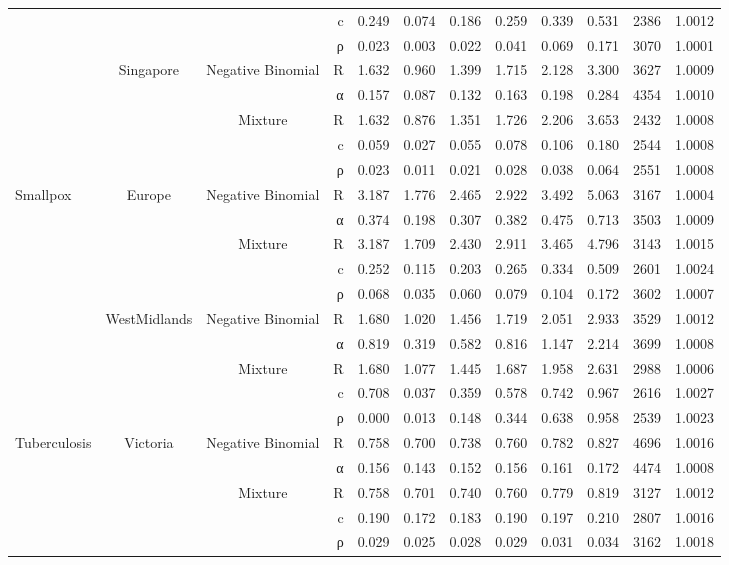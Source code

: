 \begin{table}[ht]
\begin{tabular}{lccrrrrrrrrr}
   &  &  & c & 0.249 & 0.074 & 0.186 & 0.259 & 0.339 & 0.531 & 2386 & 1.0012 \\ 
   &  &  & ρ & 0.023 & 0.003 & 0.022 & 0.041 & 0.069 & 0.171 & 3070 & 1.0001 \\ 
   & Singapore & Negative Binomial & R & 1.632 & 0.960 & 1.399 & 1.715 & 2.128 & 3.300 & 3627 & 1.0009 \\ 
   &  &  & α & 0.157 & 0.087 & 0.132 & 0.163 & 0.198 & 0.284 & 4354 & 1.0010 \\ 
   &  & Mixture & R & 1.632 & 0.876 & 1.351 & 1.726 & 2.206 & 3.653 & 2432 & 1.0008 \\ 
   &  &  & c & 0.059 & 0.027 & 0.055 & 0.078 & 0.106 & 0.180 & 2544 & 1.0008 \\ 
   &  &  & ρ & 0.023 & 0.011 & 0.021 & 0.028 & 0.038 & 0.064 & 2551 & 1.0008 \\ 
  Smallpox & Europe & Negative Binomial & R & 3.187 & 1.776 & 2.465 & 2.922 & 3.492 & 5.063 & 3167 & 1.0004 \\ 
   &  &  & α & 0.374 & 0.198 & 0.307 & 0.382 & 0.475 & 0.713 & 3503 & 1.0009 \\ 
   &  & Mixture & R & 3.187 & 1.709 & 2.430 & 2.911 & 3.465 & 4.796 & 3143 & 1.0015 \\ 
   &  &  & c & 0.252 & 0.115 & 0.203 & 0.265 & 0.334 & 0.509 & 2601 & 1.0024 \\ 
   &  &  & ρ & 0.068 & 0.035 & 0.060 & 0.079 & 0.104 & 0.172 & 3602 & 1.0007 \\ 
   & WestMidlands & Negative Binomial & R & 1.680 & 1.020 & 1.456 & 1.719 & 2.051 & 2.933 & 3529 & 1.0012 \\ 
   &  &  & α & 0.819 & 0.319 & 0.582 & 0.816 & 1.147 & 2.214 & 3699 & 1.0008 \\ 
   &  & Mixture & R & 1.680 & 1.077 & 1.445 & 1.687 & 1.958 & 2.631 & 2988 & 1.0006 \\ 
   &  &  & c & 0.708 & 0.037 & 0.359 & 0.578 & 0.742 & 0.967 & 2616 & 1.0027 \\ 
   &  &  & ρ & 0.000 & 0.013 & 0.148 & 0.344 & 0.638 & 0.958 & 2539 & 1.0023 \\ 
  Tuberculosis & Victoria & Negative Binomial & R & 0.758 & 0.700 & 0.738 & 0.760 & 0.782 & 0.827 & 4696 & 1.0016 \\ 
   &  &  & α & 0.156 & 0.143 & 0.152 & 0.156 & 0.161 & 0.172 & 4474 & 1.0008 \\ 
   &  & Mixture & R & 0.758 & 0.701 & 0.740 & 0.760 & 0.779 & 0.819 & 3127 & 1.0012 \\ 
   &  &  & c & 0.190 & 0.172 & 0.183 & 0.190 & 0.197 & 0.210 & 2807 & 1.0016 \\ 
   &  &  & ρ & 0.029 & 0.025 & 0.028 & 0.029 & 0.031 & 0.034 & 3162 & 1.0018 \\ 
   \hline
\end{tabular}
\end{table}
